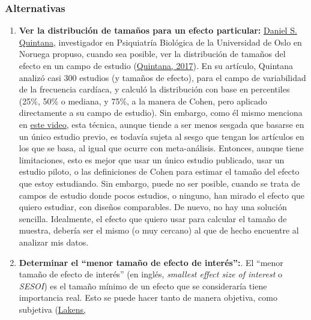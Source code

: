 \documentclass[
]{article}
\begin{document}
\hypertarget{alternativas}{%
\subsubsection{Alternativas}\label{alternativas}}

\begin{enumerate}
\def\labelenumi{\arabic{enumi}.}
\item
  \textbf{Ver la distribución de tamaños para un efecto particular:}
  \href{https://www.dsquintana.com/}{Daniel S. Quintana}, investigador
  en Psiquiatría Biológica de la Universidad de Oslo en Noruega propuso,
  cuando sea posible, ver la distribución de tamaños del efecto en un
  campo de estudio
  (\protect\hyperlink{ref-quintanaStatisticalConsiderationsReporting2017}{Quintana,
  2017}). En su artículo, Quintana analizó casi 300 estudios (y tamaños
  de efecto), para el campo de variabilidad de la frecuencia cardíaca, y
  calculó la distribución con base en percentiles (25\%, 50\% o mediana,
  y 75\%, a la manera de Cohen, pero aplicado directamente a su campo de
  estudio). Sin embargo, como él mismo menciona en
  \href{https://youtu.be/ZIjOG8LTTh8}{este video}, esta técnica, aunque
  tiende a ser menos sesgada que basarse en un único estudio previo, es
  todavía sujeta al sesgo que tengan los artículos en los que se basa,
  al igual que ocurre con meta-análisis. \newline \newline Entonces,
  aunque tiene limitaciones, esto es mejor que usar un único estudio
  publicado, usar un estudio piloto, o las definiciones de Cohen para
  estimar el tamaño del efecto que estoy estudiando. Sin embargo, puede
  no ser posible, cuando se trata de campos de estudio donde pocos
  estudios, o ninguno, han mirado el efecto que quiero estudiar, con
  diseños comparables. \newline \newline De nuevo, no hay una solución
  sencilla. Idealmente, el efecto que quiero usar para calcular el
  tamaño de muestra, debería ser el mismo (o muy cercano) al que de
  hecho encuentre al analizar mis datos.
\item
  \textbf{Determinar el ``menor tamaño de efecto de interés'':}. El
  ``menor tamaño de efecto de interés'' (en inglés, \emph{smallest
  effect size of interest} o \emph{SESOI}) es el tamaño mínimo de un
  efecto que se consideraría tiene importancia real. Esto se puede hacer
  tanto de manera objetiva, como subjetiva
  (\protect\hyperlink{ref-lakensEquivalenceTestingPsychological2018a}{Lakens,
}
\end{enumerate}
\end{document}
